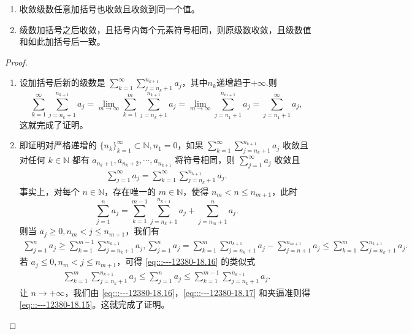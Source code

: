 \documentclass[../../main.tex]{subfiles}
\begin{document}
\begin{theorem}[级数加括号的理解]\label{theorem:级数加括号的理解}
\begin{enumerate}
\item 收敛级数任意加括号也收敛且收敛到同一个值。

\item 级数加括号之后收敛，且括号内每个元素符号相同，则原级数收敛，且级数值和如此加括号后一致。
\end{enumerate}
\end{theorem}
\begin{proof}
\begin{enumerate}
\item 设加括号后新的级数是 \( \sum_{k = 1}^{\infty} \sum_{j = n_k + 1}^{n_{k + 1}} a_j \)，其中$n_k$递增趋于$+\infty.$则
\[
\sum_{k = 1}^{\infty} \sum_{j = n_k + 1}^{n_{k + 1}} a_j = \lim_{m \to \infty} \sum_{k = 1}^{m} \sum_{j = n_k + 1}^{n_{k + 1}} a_j = \lim_{m \to \infty} \sum_{j = n_1 + 1}^{n_{m + 1}} a_j = \sum_{j = n_1 + 1}^{\infty} a_j,
\]
这就完成了证明。

\item 即证明对严格递增的 \( \{n_k\}_{k = 1}^{\infty} \subset \mathbb{N}, n_1 = 0 \)，如果 \( \sum_{k = 1}^{\infty} \sum_{j = n_k + 1}^{n_{k + 1}} a_j \) 收敛且对任何 \( k \in \mathbb{N} \) 都有 \( a_{n_k + 1}, a_{n_k + 2}, \cdots, a_{n_{k + 1}} \) 将符号相同，则 \( \sum_{j = 1}^{\infty} a_j \) 收敛且
\begin{align}
\sum_{j = 1}^{\infty} a_j = \sum_{k = 1}^{\infty} \sum_{j = n_k + 1}^{n_{k + 1}} a_j. \label{eq:::---12380-18.15}
\end{align}
事实上，对每个 \( n \in \mathbb{N} \)，存在唯一的 \( m \in \mathbb{N} \)，使得 \( n_m < n \leqslant n_{m + 1} \)，此时
\[
\sum_{j = 1}^{n} a_j = \sum_{k = 1}^{m - 1} \sum_{j = n_k + 1}^{n_{k + 1}} a_j + \sum_{j = n_m + 1}^{n} a_j.
\]
则当 \( a_j \geqslant 0, n_m < j \leqslant n_{m + 1} \)，我们有
\begin{align}
\sum_{j = 1}^{n} a_j \geqslant \sum_{k = 1}^{m - 1} \sum_{j = n_k + 1}^{n_{k + 1}} a_j, \sum_{j = 1}^{n} a_j = \sum_{k = 1}^{m} \sum_{j = n_k + 1}^{n_{k + 1}} a_j - \sum_{j = n + 1}^{n_{m + 1}} a_j \leqslant \sum_{k = 1}^{m} \sum_{j = n_k + 1}^{n_{k + 1}} a_j. \label{eq:::---12380-18.16}
\end{align}
若 \( a_j \leqslant 0, n_m < j \leqslant n_{m + 1} \)，可得 \eqref{eq:::---12380-18.16} 的类似式
\begin{align}
\sum_{k = 1}^{m} \sum_{j = n_k + 1}^{n_{k + 1}} a_j \leqslant \sum_{j = 1}^{n} a_j \leqslant \sum_{k = 1}^{m - 1} \sum_{j = n_k + 1}^{n_{k + 1}} a_j. \label{eq:::---12380-18.17}
\end{align}
让 \( n \to +\infty \)，我们由 \eqref{eq:::---12380-18.16}，\eqref{eq:::---12380-18.17} 和夹逼准则得 \eqref{eq:::---12380-18.15}。这就完成了证明。
\end{enumerate}
\end{proof}
\end{document}
